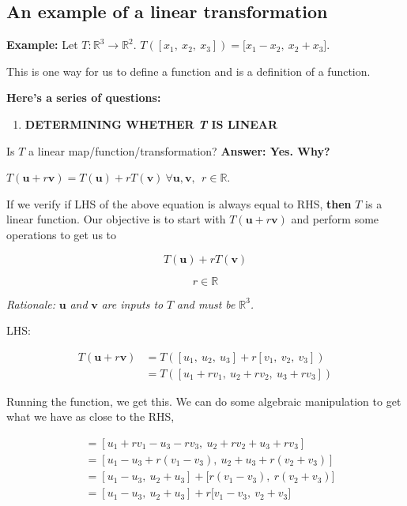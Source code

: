 \documentclass[12pt]{article}
\theoremstyle{plain}
\theoremstyle{remark}
\theoremstyle{definition}
\begin{document}
\subsection{An example of a linear
transformation}

\textbf{Example:} Let \(T:\mathbb{R}^{3} \rightarrow \mathbb{R}^{2}\).
\(T\left( \left\lbrack x_{1},\ x_{2},\ x_{3} \right\rbrack \right) = \lbrack x_{1} - x_{2},\ x_{2} + x_{3}\rbrack\).

This is one way for us to define a function and is a definition of a
function.

\textbf{Here's a series of questions:}

\begin{enumerate}
\def\labelenumi{\arabic{enumi}.}
\item
  \textbf{DETERMINING WHETHER \emph{T} IS LINEAR}
\end{enumerate}

Is \(T\) a linear map/function/transformation? \textbf{Answer: Yes.
Why?}

\(T\left( \mathbf{u} + r\mathbf{v} \right) = T\left( \mathbf{u} \right) + rT\left( \mathbf{v} \right)\ \forall\mathbf{u},\mathbf{v},\ \ r\mathbb{\in R}\).

If we verify if LHS of the above equation is always equal to RHS,
\textbf{then} \(T\) is a linear function. Our objective is to start with
\(T(\mathbf{u} + r\mathbf{v})\) and perform some operations to
get us to

\[T\left( \mathbf{u} \right) + rT(\mathbf{v})
\]

\[r\mathbb{\in R}\]

\emph{Rationale:} \(\mathbf{u}\) \emph{and} \(\mathbf{v}\)
\emph{are inputs to} \(T\) \emph{and must be} \(\mathbb{R}^{3}\)\emph{.}

LHS:

\begin{align*}
T\left( \mathbf{u} + r\mathbf{v} \right) &= T\left( \left\lbrack u_{1},\ u_{2},\ u_{3} \right\rbrack + r\left\lbrack v_{1},\ v_{2},\ v_{3} \right\rbrack \right) \\
&= T\left( \left\lbrack u_{1} + rv_{1},\ u_{2} + rv_{2},\ u_{3} + rv_{3} \right\rbrack \right)
\end{align*}


Running the function, we get this. We can do some algebraic manipulation
to get what we have as close to the RHS,

\begin{align*}
&= \left\lbrack u_{1} + rv_{1} - u_{3} - rv_{3},\ u_{2} + rv_{2} + u_{3} + rv_{3} \right\rbrack \\
&= \left\lbrack u_{1} - u_{3} + r\left( v_{1} - v_{3} \right),\ u_{2} + u_{3} + r\left( v_{2} + v_{3} \right) \right\rbrack \\
&= \left\lbrack u_{1} - u_{3},\ u_{2} + u_{3} \right\rbrack + \lbrack r\left( v_{1} - v_{3} \right),\ r\left( v_{2} + v_{3} \right)\rbrack \\
&= \left\lbrack u_{1} - u_{3},\ u_{2} + u_{3} \right\rbrack + r\lbrack v_{1} - v_{3},\ v_{2} + v_{3}\rbrack
\end{align*}
\end{document}
